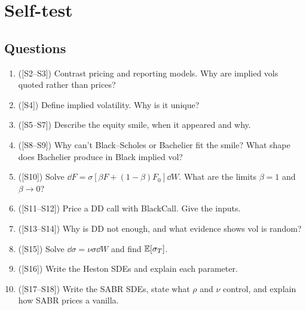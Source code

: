 \documentclass[10pt]{article}
\begin{document}
\section{Self-test}
\subsection*{Questions}
\begin{enumerate}[label=Q\arabic*.]
\item ([S2--S3]) Contrast pricing and reporting models. Why are implied vols quoted rather than prices?
\item ([S4]) Define implied volatility. Why is it unique?
\item ([S5--S7]) Describe the equity smile, when it appeared and why.
\item ([S8--S9]) Why can't Black--Scholes or Bachelier fit the smile? What shape does Bachelier produce in Black implied vol?
\item ([S10]) Solve $\dd F=\sigma[\beta F+(1-\beta)F_0]\dd W$. What are the limits $\beta=1$ and $\beta\to0$?
\item ([S11--S12]) Price a DD call with BlackCall. Give the inputs.
\item ([S13--S14]) Why is DD not enough, and what evidence shows vol is random?
\item ([S15]) Solve $\dd\sigma=\nu\sigma\dd W$ and find $\mathbb{E}[\sigma_T]$.
\item ([S16]) Write the Heston SDEs and explain each parameter.
\item ([S17--S18]) Write the SABR SDEs, state what $\rho$ and $\nu$ control, and explain how SABR prices a vanilla.
\end{enumerate}
\end{document}

